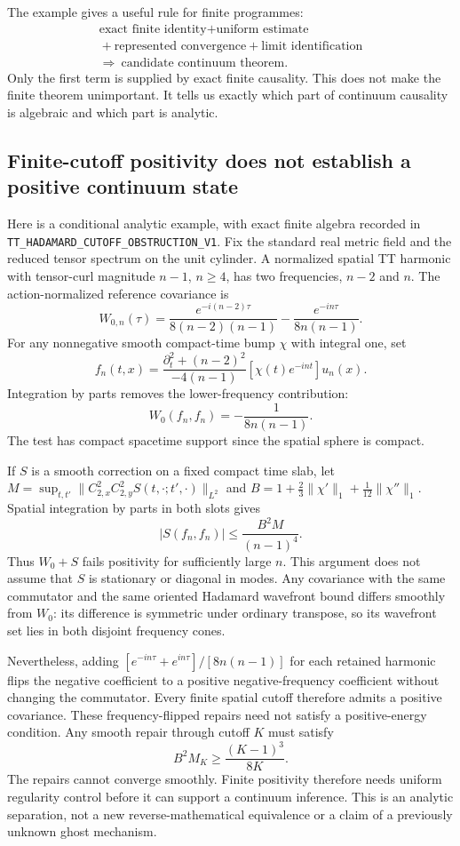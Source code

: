 \documentclass[11pt]{article}
\theoremstyle{definition}
\theoremstyle{remark}
\newcommand{\cert}[1]{\nolinkurl{#1}}
\begin{document}
The example gives a useful rule for finite programmes:
\[
\begin{gathered}
 \text{exact finite identity}+\text{uniform estimate}\\
 {}+\text{represented convergence}+\text{limit identification}\\
 \Longrightarrow\ \text{candidate continuum theorem}.
\end{gathered}
\]
Only the first term is supplied by exact finite causality.  This does not make
the finite theorem unimportant.  It tells us exactly which part of continuum
causality is algebraic and which part is analytic.

\subsection{Finite-cutoff positivity does not establish a positive continuum state}
\label{sec:tt-cutoff-positivity}

Here is a conditional analytic example, with exact finite algebra recorded in
\cert{TT_HADAMARD_CUTOFF_OBSTRUCTION_V1}. Fix the standard real metric field
and the reduced tensor spectrum on the unit cylinder. A normalized spatial
TT harmonic with tensor-curl magnitude $n-1$, $n\ge4$, has two frequencies,
$n-2$ and $n$. The action-normalized reference covariance is
\[
 W_{0,n}(\tau)=\frac{e^{-i(n-2)\tau}}{8(n-2)(n-1)}
             -\frac{e^{-in\tau}}{8n(n-1)}.
\]
For any nonnegative smooth compact-time bump $\chi$ with integral one, set
\[
 f_n(t,x)=\frac{\partial_t^2+(n-2)^2}{-4(n-1)}
                  [\chi(t)e^{-int}]u_n(x).
\]
Integration by parts removes the lower-frequency contribution:
\[ W_0(f_n,f_n)=-\frac{1}{8n(n-1)}. \]
The test has compact spacetime support since the spatial sphere is compact.

If $S$ is a smooth correction on a fixed compact time slab, let
$M=\sup_{t,t'}\|C_{2,x}^2 C_{2,y}^2 S(t,\cdot;t',\cdot)\|_{L^2}$ and
$B=1+\frac23\|\chi'\|_1+\frac1{12}\|\chi''\|_1$.
Spatial integration by parts in both slots gives
\[
 |S(f_n,f_n)|\le\frac{B^2M}{(n-1)^4}.
\]
Thus $W_0+S$ fails positivity for sufficiently large $n$. This argument does
not assume that $S$ is stationary or diagonal in modes. Any covariance with
the same commutator and the same oriented Hadamard wavefront bound differs
smoothly from $W_0$: its difference is symmetric under ordinary transpose,
so its wavefront set lies in both disjoint frequency cones.

Nevertheless, adding
$[e^{-in\tau}+e^{in\tau}]/[8n(n-1)]$ for each retained harmonic flips the
negative coefficient to a positive negative-frequency coefficient without
changing the commutator. Every finite spatial cutoff therefore admits a
positive covariance. These frequency-flipped repairs need not satisfy a
positive-energy condition. Any smooth repair through cutoff $K$ must satisfy
\[
                         B^2M_K\ge\frac{(K-1)^3}{8K}.
\]
The repairs cannot converge smoothly. Finite positivity therefore needs
uniform regularity control before it can support a continuum inference.
This is an analytic separation, not a new reverse-mathematical equivalence
or a claim of a previously unknown ghost mechanism.
\end{document}
